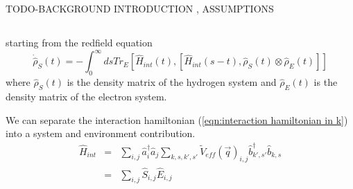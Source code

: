 
\subsection{}
TODO-BACKGROUND INTRODUCTION , ASSUMPTIONS

\subsection{}
starting from the redfield equation
\begin{equation}
    \dot{\hat{\rho}}_S(t) =
    - \int_0^{\infty} ds
    Tr_{E}[\hat{H}_{int}(t),
            [\hat{H}_{int}(s-t),
                    \hat{\rho}_S(t) \otimes \hat{\rho}_E(t)]]
\end{equation}
where \(\hat{\rho}_S(t)\) is the
density matrix of the hydrogen system
and \(\hat{\rho}_E(t)\) is the density
matrix of the electron system.

We can separate the interaction
hamiltonian (\cref{eqn:interaction hamiltonian in k})
into a system and environment contribution.
\begin{eqnarray}
    \hat{H}_{int} &=& \sum_{i,j} \hat{a}^\dagger_{i}\hat{a}_{j}
    \sum_{k,s,k',s'} {\tilde{V}_{eff}(\vec{q})}_{i,j}
    \hat{b}^\dagger_{k',s'}\hat{b}_{k,s}\\
    &=& \sum_{i,j} \hat{S}_{i,j} \hat{E}_{i,j}
\end{eqnarray}